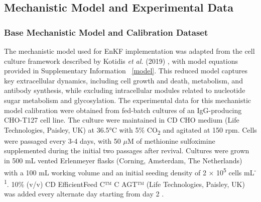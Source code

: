 \subsection{Mechanistic Model and Experimental Data}
\subsubsection{Base Mechanistic Model and Calibration Dataset}
The mechanistic model used for EnKF implementation was adapted from the cell culture framework described by Kotidis \textit{et al.} (2019) \cite{Kotidis2019Model-basedCulture}, with model equations provided in Supplementary Information ~\ref{model}. This reduced model captures key extracellular dynamics, including cell growth and death, metabolism, and antibody synthesis, while excluding intracellular modules related to nucleotide sugar metabolism and glycosylation. The experimental data for this mechanistic model calibration were obtained from fed-batch cultures of an IgG-producing CHO-T127 cell line. The culture were maintained in CD CHO medium (Life Technologies, Paisley, UK) at 36.5°C with 5\% CO\textsubscript{2} and agitated at 150 rpm. Cells were passaged every 3-4 days, with 50 $\mu$M of methionine sulfoximine supplemented during the initial two passages after revival. Cultures were grown in 500 mL vented Erlenmeyer flasks (Corning, Amsterdam, The Netherlands) with a 100 mL working volume and an initial seeding density of 2 × 10\textsuperscript{5} cells mL\textsuperscript{-1}. 10\% (v/v) CD EfficientFeed C™ C AGT™ (Life Technologies, Paisley, UK) was added every alternate day starting from day 2 \cite{Kotidis2019Model-basedCulture}.

